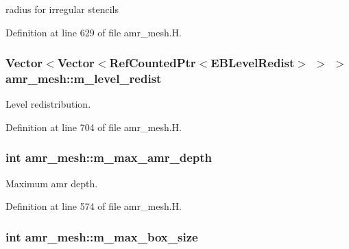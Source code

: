 radius for irregular stencils 



Definition at line 629 of file amr\+\_\+mesh.\+H.

\subsubsection[{\texorpdfstring{m\+\_\+level\+\_\+redist}{m_level_redist}}]{\setlength{\rightskip}{0pt plus 5cm}Vector$<$Vector$<$Ref\+Counted\+Ptr$<$E\+B\+Level\+Redist$>$ $>$ $>$ amr\+\_\+mesh\+::m\+\_\+level\+\_\+redist\hspace{0.3cm}{\ttfamily [protected]}}\hypertarget{classamr__mesh_ac78f1491d15e3584cdd624e5b0424e50}{}\label{classamr__mesh_ac78f1491d15e3584cdd624e5b0424e50}


Level redistribution. 



Definition at line 704 of file amr\+\_\+mesh.\+H.

\subsubsection[{\texorpdfstring{m\+\_\+max\+\_\+amr\+\_\+depth}{m_max_amr_depth}}]{\setlength{\rightskip}{0pt plus 5cm}int amr\+\_\+mesh\+::m\+\_\+max\+\_\+amr\+\_\+depth\hspace{0.3cm}{\ttfamily [protected]}}\hypertarget{classamr__mesh_a8bdb6d337b7ed7d38b3284f487a8bec6}{}\label{classamr__mesh_a8bdb6d337b7ed7d38b3284f487a8bec6}


Maximum amr depth. 



Definition at line 574 of file amr\+\_\+mesh.\+H.

\subsubsection[{\texorpdfstring{m\+\_\+max\+\_\+box\+\_\+size}{m_max_box_size}}]{\setlength{\rightskip}{0pt plus 5cm}int amr\+\_\+mesh\+::m\+\_\+max\+\_\+box\+\_\+size\hspace{0.3cm}{\ttfamily [protected]}}\hypertarget{classamr__mesh_a9edf00a92abe19643287778d08cc7e7d}{}\label{classamr__mesh_a9edf00a92abe19643287778d08cc7e7d}


